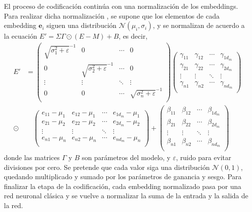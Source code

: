 				El proceso de codificación continúa con una normalización de los embeddings. Para realizar dicha normalización \cite{normalization}, se supone que los elementos de cada embedding $\textbf{e}_i$ siguen una distribución $\mathcal{N}(\mu_i, \sigma_i)$, y se normalizan de acuerdo a la ecuación $E' = \Sigma\Gamma\odot(E - M) + B$, es decir, 
				\begin{align*}
					E' &= \begin{pmatrix}
						\sqrt{\sigma^2_1 + \varepsilon}^{-1} & 0 & \cdots & 0\\
						0 & \sqrt{\sigma^2_2 + \varepsilon}^{-1} & \cdots & 0\\
						\vdots & \vdots & \ddots & \vdots\\
						0 & 0 & \cdots & \sqrt{\sigma^2_n + \varepsilon}^{-1}\\
					\end{pmatrix}
					\begin{pmatrix}
						\gamma_{11} & \gamma_{12} & \cdots & \gamma_{1d_m}\\
						\gamma_{21} & \gamma_{22} & \cdots & \gamma_{2d_m}\\
						\vdots & \vdots & \ddots & \vdots\\
						\gamma_{n1} & \gamma_{n2} & \cdots & \gamma_{nd_m}\\
					\end{pmatrix} \\
					\odot&\quad \begin{pmatrix}
						e_{11} - \mu_1 & e_{12} - \mu_1 & \cdots & e_{1d_m} - \mu_1\\
						e_{21} - \mu_2 & e_{22} - \mu_2 & \cdots & e_{2d_m} - \mu_2\\
						\vdots & \vdots & \ddots & \vdots\\
						e_{n1} - \mu_n & e_{n2} - \mu_n & \cdots & e_{nd_m} - \mu_n\\
					\end{pmatrix} + \begin{pmatrix}
						\beta_{11} & \beta_{12} & \cdots & \beta_{1d_m}\\
						\beta_{21} & \beta_{22} & \cdots & \beta_{2d_m}\\
						\vdots & \vdots & \ddots & \vdots\\
						\beta_{n1} & \beta_{n2} & \cdots & \beta_{nd_m}\\
					\end{pmatrix}
				\end{align*}
				donde las matrices $\Gamma$ y $B$ son parámetros del modelo, y $\varepsilon$, ruido para evitar divisiones por cero. Se pretende que cada valor siga una distribución $\mathcal{N}(0, 1)$, quedando multiplicado y sumado por los parámetros de ganancia y sesgo. Para finalizar la etapa de la codificación, cada embedding normalizado pasa por una red neuronal clásica y se vuelve a normalizar la suma de la entrada y la salida de la red. 
				
